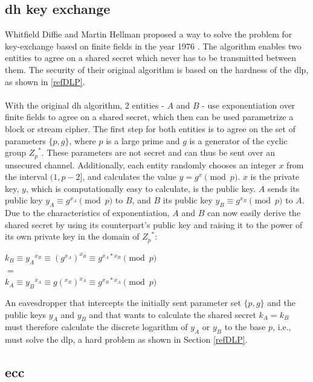 \subsection{\gls{dh} key exchange}

Whitfield Diffie and Martin Hellman proposed a way to solve the problem for key-exchange based on finite fields in the year 1976 \cite{1055638}.
The algorithm enables two entities to agree on a shared secret which never has to be transmitted between them. The security of their original algorithm
is based on the hardness of the \gls{dlp}, as shown in \ref{refDLP}.
\\
\\
With the original \gls{dh} algorithm, 2 entities - $A$ and $B$ - use exponentiation over finite fields to agree on a shared secret, which
then can be used parametrize a block or stream cipher. The first step for both entities is to agree on the set of parameters $\{p, g\}$, where $p$ is a 
large prime and $g$ is a generator of the cyclic group ${Z_p}^*$. These parameters are not secret and
can thus be sent over an unsecured channel.
Additionally, each entity randomly chooses an integer $x$ from the interval $(1, p-2]$, and calculates the value $y = g^x \pmod p$. $x$ is the private key,
$y$, which is computationally easy to calculate, is the public key. $A$ sends its public key $y_A \equiv g^{x_A} \pmod p$ to $B$, and $B$ its public key
$y_B \equiv g^{x_B} \pmod p$ to $A$. Due to the characteristics of exponentiation, $A$ and $B$ can now easily derive the shared secret by using its counterpart's
public key and raising it to the power of its own private key in the domain of ${Z_p}^*$:

\begin{center}
 $k_B \equiv {y_A}^{x_B} \equiv (g^{x_A})^{x_B} \equiv g^{x_A*x_B} \pmod p $\\
 $ = $ \\
 $ k_A \equiv {y_B}^{x_A} \equiv g(^{x_B})^{x_A} \equiv g^{x_B*x_A} \pmod p $
\end{center}
An eavesdropper that intercepts the initially sent parameter set $\{p, g\}$ and the public keys $y_A$ and $y_B$ and that wants to calculate the shared secret
$k_A = k_B$  must therefore calculate the discrete logarithm of $y_A$ or $y_B$ to the base $p$, i.e., must solve the \gls{dlp}, a hard problem as shown in
Section \ref{refDLP}.
\\

\subsection{\gls{ecc}}

